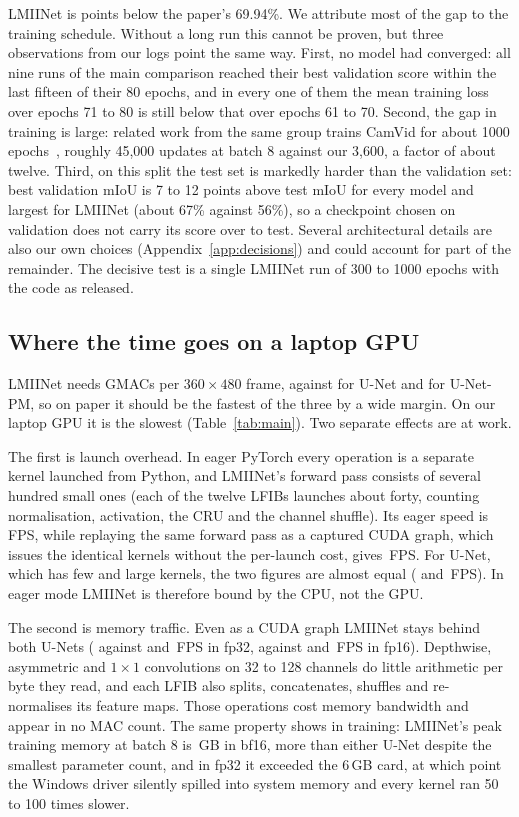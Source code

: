\documentclass{article}
\begin{document}
LMIINet is \PaperGap{} points below the paper's 69.94\%. We attribute most of the gap to the
training schedule. Without a long run this cannot be proven, but three observations from our logs
point the same way. First, no model had converged: all nine runs of the main comparison reached
their best validation score within the last fifteen of their 80 epochs, and in every one of them
the mean training loss over epochs 71 to 80 is still below that over epochs 61 to 70. Second, the
gap in training is large: related work from the same group trains CamVid for about 1000
epochs~\cite{xu2023letnet}, roughly 45,000 updates at batch 8 against our 3,600, a factor of
about twelve. Third, on this split the test set is markedly harder than the validation set: best
validation mIoU is 7 to 12 points above test mIoU for every model and largest for LMIINet (about
67\% against 56\%), so a checkpoint chosen on validation does not carry its score over to test.
Several architectural details are also our own choices (Appendix~\ref{app:decisions}) and could
account for part of the remainder. The decisive test is a single LMIINet run of 300 to 1000
epochs with the code as released.

\subsection{Where the time goes on a laptop GPU}
LMIINet needs \LmiiGmacs{} GMACs per $360{\times}480$ frame, against \UnetGmacs{} for U-Net and
\UnetPmGmacs{} for U-Net-PM, so on paper it should be the fastest of the three by a wide margin.
On our laptop GPU it is the slowest (Table~\ref{tab:main}). Two separate effects are at work.

The first is launch overhead. In eager PyTorch every operation is a separate kernel launched from
Python, and LMIINet's forward pass consists of several hundred small ones (each of the twelve LFIBs launches about
forty, counting normalisation, activation, the CRU and the channel shuffle). Its eager speed is \LmiiFps{}\,FPS, while replaying
the same forward pass as a captured CUDA graph, which issues the identical kernels without the
per-launch cost, gives \LmiiFpsG{}\,FPS. For U-Net, which has few and large kernels, the two
figures are almost equal (\UnetFps{} and \UnetFpsG{}\,FPS). In eager mode LMIINet is therefore
bound by the CPU, not the GPU.

The second is memory traffic. Even as a CUDA graph LMIINet stays behind both U-Nets
(\LmiiFpsG{} against \UnetFpsG{} and \UnetPmFpsG{}\,FPS in fp32, \LmiiFpsGH{} against \UnetFpsGH{}
and \UnetPmFpsGH{}\,FPS in fp16). Depthwise, asymmetric and $1{\times}1$ convolutions on 32 to 128
channels do little arithmetic per byte they read, and each LFIB also splits, concatenates, shuffles
and re-normalises its feature maps. Those operations cost memory bandwidth and appear in no MAC
count. The same property shows in training: LMIINet's peak training memory at batch 8 is
\LmiiPeakGB{}\,GB in bf16, more than either U-Net despite the smallest parameter count, and in fp32
it exceeded the 6\,GB card, at which point the Windows driver silently spilled into system memory
and every kernel ran 50 to 100 times slower.
\end{document}
